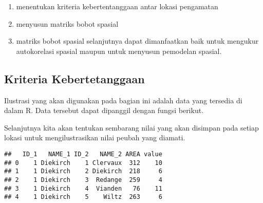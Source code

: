 \documentclass[
]{book}
\newenvironment{Shaded}{\begin{snugshade}}{\end{snugshade}}
\newcommand{\AttributeTok}[1]{\textcolor[rgb]{0.77,0.63,0.00}{#1}}
\newcommand{\DecValTok}[1]{\textcolor[rgb]{0.00,0.00,0.81}{#1}}
\newcommand{\FunctionTok}[1]{\textcolor[rgb]{0.00,0.00,0.00}{#1}}
\newcommand{\NormalTok}[1]{#1}
\newcommand{\OtherTok}[1]{\textcolor[rgb]{0.56,0.35,0.01}{#1}}
\newcommand{\SpecialCharTok}[1]{\textcolor[rgb]{0.00,0.00,0.00}{#1}}
\newcommand{\StringTok}[1]{\textcolor[rgb]{0.31,0.60,0.02}{#1}}
\begin{document}
\begin{enumerate}
\def\labelenumi{(\arabic{enumi})}
\item
  menentukan kriteria kebertentanggaan antar lokasi pengamatan
\item
  menyusun matriks bobot spasial
\item
  matriks bobot spasial selanjutnya dapat dimanfaatkan baik untuk mengukur autokorelasi spasial maupun untuk menyusun pemodelan spasial.
\end{enumerate}

\hypertarget{kriteria-kebertetanggaan}{%
\subsection{Kriteria Kebertetanggaan}\label{kriteria-kebertetanggaan}}

Ilustrasi yang akan digunakan pada bagian ini adalah data yang tersedia di dalam R. Data tersebut dapat dipanggil dengan fungsi berikut.

\begin{Shaded}
\end{Shaded}

Selanjutnya kita akan tentukan sembarang nilai yang akan disimpan pada setiap lokasi untuk mengilustrasikan nilai peubah yang diamati.

\begin{Shaded}
\end{Shaded}

\begin{verbatim}
##   ID_1   NAME_1 ID_2   NAME_2 AREA value
## 0    1 Diekirch    1 Clervaux  312    10
## 1    1 Diekirch    2 Diekirch  218     6
## 2    1 Diekirch    3  Redange  259     4
## 3    1 Diekirch    4  Vianden   76    11
## 4    1 Diekirch    5    Wiltz  263     6
\end{verbatim}
\end{document}
